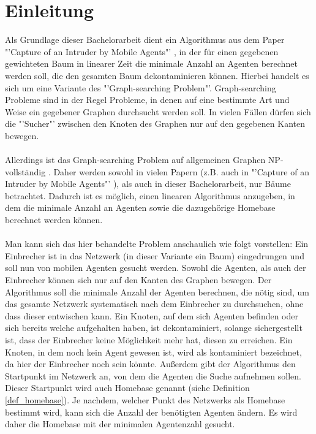 \section{Einleitung}

Als Grundlage dieser Bachelorarbeit dient ein Algorithmus aus dem Paper "'Capture of an Intruder by Mobile Agents"' \cite{cima_paper}, in der für einen gegebenen gewichteten Baum in linearer Zeit die minimale Anzahl an Agenten berechnet werden soll, die den gesamten Baum dekontaminieren können. Hierbei handelt es sich um eine Variante des "'Graph-searching Problem"'. Graph-searching Probleme sind in der Regel Probleme, in denen auf eine bestimmte Art und Weise ein gegebener Graphen durchsucht werden soll. In vielen Fällen dürfen sich die "'Sucher"' zwischen den Knoten des Graphen nur auf den gegebenen Kanten bewegen.
\\
\\
Allerdings ist das Graph-searching Problem auf allgemeinen Graphen NP-vollständig \cite{complexity_paper}. Daher werden sowohl in vielen Papern (z.B. auch in "'Capture of an Intruder by Mobile Agents"' \cite{cima_paper}), als auch in dieser Bachelorarbeit, nur Bäume betrachtet. Dadurch ist es möglich, einen linearen Algorithmus anzugeben, in dem die minimale Anzahl an Agenten sowie die dazugehörige Homebase berechnet werden können.
\\
\\
Man kann sich das hier behandelte Problem anschaulich wie folgt vorstellen: Ein Einbrecher ist in das Netzwerk (in dieser Variante ein Baum) eingedrungen und soll nun von mobilen Agenten gesucht werden. Sowohl die Agenten, als auch der Einbrecher können sich nur auf den Kanten des Graphen bewegen. Der Algorithmus soll die minimale Anzahl der Agenten berechnen, die nötig sind, um das gesamte Netzwerk systematisch nach dem Einbrecher zu durchsuchen, ohne dass dieser entwischen kann. Ein Knoten, auf dem sich Agenten befinden oder sich bereits welche aufgehalten haben, ist dekontaminiert, solange sichergestellt ist, dass der Einbrecher keine Möglichkeit mehr hat, diesen zu erreichen. Ein Knoten, in dem noch kein Agent gewesen ist, wird als kontaminiert bezeichnet, da hier der Einbrecher noch sein könnte. Außerdem gibt der Algorithmus den Startpunkt im Netzwerk an, von dem die Agenten die Suche aufnehmen sollen. Dieser Startpunkt wird auch Homebase genannt (siehe Definition \ref{def_homebase}). Je nachdem, welcher Punkt des Netzwerks als Homebase bestimmt wird, kann sich die Anzahl der benötigten Agenten ändern. Es wird daher die Homebase mit der minimalen Agentenzahl gesucht.
